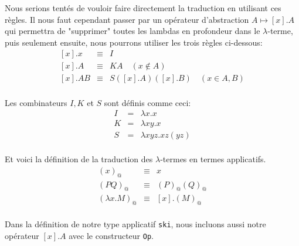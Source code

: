 \documentclass[11pt]{book}
\begin{document}
Nous serions tentés de vouloir faire directement la traduction en utilisant ces règles.
Il nous faut cependant passer par un opérateur d'abstraction $A \mapsto [x].A$ qui permettra de "supprimer" toutes 
les lambdas en profondeur dans le $\lambda$-terme, puis seulement ensuite, nous pourrons utiliser les trois règles ci-dessous:
\[
\begin{array}{lcl}
	{[x]}  . x   &\equiv & I \\
	{[x]} .  A   &\equiv & K A \quad (x \notin A) \\
	{[x]}  . A B &\equiv & S ([x] . A)([x] . B)  \quad (x \in A,B) \\
\end{array}
\]

Les combinateurs $I, K$ et $S$ sont définis comme ceci:
\[
\begin{array}{ccc}
	I &=& \lambda x . x \\
	K &=& \lambda x y . x \\
	S &=& \lambda x y z . x z (y z) \\
\end{array}	
\]

Et voici la définition de la traduction des $\lambda$-termes en termes applicatifs.
\[
\begin{array}{lcl}
	 (x)_@  &\equiv & x \\
	(PQ)_@  &\equiv & (P)_@ (Q)_@ \\
	(\lambda x.M)_@  &\equiv & [x] .(M)_@   \\
\end{array}
\]

Dans la définition de notre type applicatif \verb+ski+, nous incluons aussi notre opérateur $[x].A$ 
avec le constructeur \verb+Op+.
\end{document}
